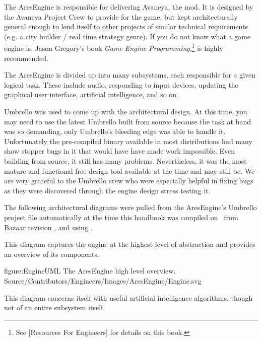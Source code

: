 

The AresEngine is responsible for delivering Avaneya, the mod. It is designed by the Avaneya Project Crew to provide for the game, but kept architecturally general enough to lend itself to other projects of similar technical requirements (e.g. a city builder / real time strategy genre). If you do not know what a game engine is, Jason Gregory's book {\it Game Engine Programming},\footnote{See [Resources For Engineers] for details on this book.} is highly recommended.

The AresEngine is divided up into many subsystems, each responsible for a given logical task. These include audio, responding to input devices, updating the graphical user interface, artificial intelligence, and so on.

Umbrello was used to come up with the architectural design. At this time, you may need to use the latest Umbrello built from source because the task at hand was so demanding, only Umbrello's bleeding edge was able to handle it. Unfortunately the pre-compiled binary available in most distributions had many show stopper bugs in it that would have have made work impossible. Even building from source, it still has many problems. Nevertheless, it was the most mature and functional free design tool available at the time and may still be. We are very grateful to the Umbrello crew who were especially helpful in fixing bugs as they were discovered through the engine design stress testing it.

The following architectural diagrams were pulled from the AresEngine's Umbrello project file automatically at the time this handbook was compiled on \currentdate\ from Bazaar revision \BazaarRevision, and using \UmbrelloVersion.

This diagram captures the engine at the highest level of abstraction and provides an overview of its components.

\FullPageDiagram
    {figure:EngineUML}
    {The AresEngine high level overview.}
    {Source/Contributors/Engineers/Images/AresEngine/Engine.svg}

This diagram concerns itself with useful artificial intelligence algorithms, though not of an entire subsystem itself.

